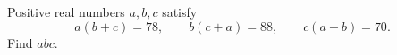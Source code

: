 Positive real numbers $a,b,c$ satisfy
\[
a(b+c)=78,\qquad b(c+a)=88,\qquad c(a+b)=70 .
\]
Find $abc$.
